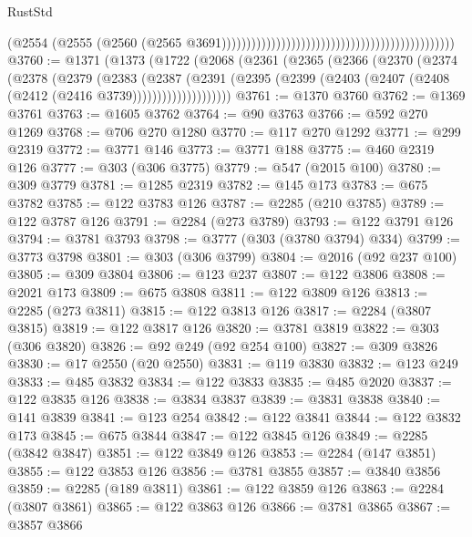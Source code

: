 \begin{lexlean}{RustStd}
\begin{coremodule}
                                                                                          (@2554
                                                                                            (@2555
                                                                                              (@2560
                                                                                                (@2565
                                                                                                  @3691)))))))))))))))))))))))))))))))))))))))))))))))
@3760 := @1371
    (@1373
      (@1722
        (@2068
          (@2361
            (@2365
              (@2366
                (@2370
                  (@2374
                    (@2378
                      (@2379
                        (@2383
                          (@2387
                            (@2391
                              (@2395
                                (@2399 (@2403 (@2407 (@2408 (@2412 (@2416 @3739))))))))))))))))))))
@3761 := @1370 @3760
@3762 := @1369 @3761
@3763 := @1605 @3762
@3764 := @90 @3763
@3766 := @592 @270 @1269
@3768 := @706 @270 @1280
@3770 := @117 @270 @1292
@3771 := @299 @2319
@3772 := @3771 @146
@3773 := @3771 @188
@3775 := @460 @2319 @126
@3777 := @303 (@306 @3775)
@3779 := @547 (@2015 @100)
@3780 := @309 @3779
@3781 := @1285 @2319
@3782 := @145 @173
@3783 := @675 @3782
@3785 := @122 @3783 @126
@3787 := @2285 (@210 @3785)
@3789 := @122 @3787 @126
@3791 := @2284 (@273 @3789)
@3793 := @122 @3791 @126
@3794 := @3781 @3793
@3798 := @3777 (@303 (@3780 @3794) @334)
@3799 := @3773 @3798
@3801 := @303 (@306 @3799)
@3804 := @2016 (@92 @237 @100)
@3805 := @309 @3804
@3806 := @123 @237
@3807 := @122 @3806
@3808 := @2021 @173
@3809 := @675 @3808
@3811 := @122 @3809 @126
@3813 := @2285 (@273 @3811)
@3815 := @122 @3813 @126
@3817 := @2284 (@3807 @3815)
@3819 := @122 @3817 @126
@3820 := @3781 @3819
@3822 := @303 (@306 @3820)
@3826 := @92 @249 (@92 @254 @100)
@3827 := @309 @3826
@3830 := @17 @2550 (@20 @2550)
@3831 := @119 @3830
@3832 := @123 @249
@3833 := @485 @3832
@3834 := @122 @3833
@3835 := @485 @2020
@3837 := @122 @3835 @126
@3838 := @3834 @3837
@3839 := @3831 @3838
@3840 := @141 @3839
@3841 := @123 @254
@3842 := @122 @3841
@3844 := @122 @3832 @173
@3845 := @675 @3844
@3847 := @122 @3845 @126
@3849 := @2285 (@3842 @3847)
@3851 := @122 @3849 @126
@3853 := @2284 (@147 @3851)
@3855 := @122 @3853 @126
@3856 := @3781 @3855
@3857 := @3840 @3856
@3859 := @2285 (@189 @3811)
@3861 := @122 @3859 @126
@3863 := @2284 (@3807 @3861)
@3865 := @122 @3863 @126
@3866 := @3781 @3865
@3867 := @3857 @3866

\end{coremodule}
\end{lexlean}
